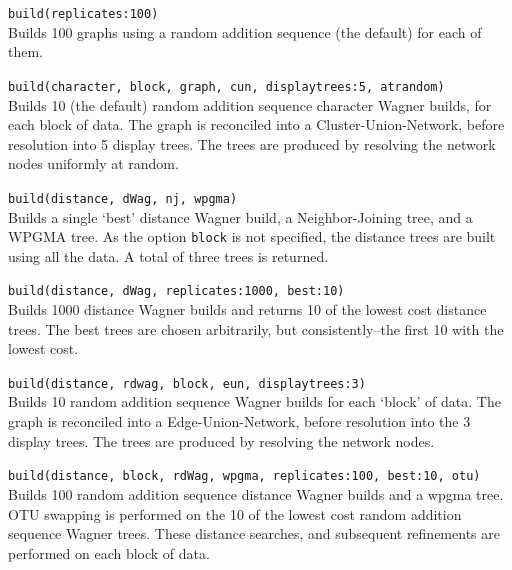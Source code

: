 	\begin{example}
		\item{\texttt{build(replicates:100)} \\
		Builds 100 graphs using a random addition sequence (the default) for each of them.}
		
		\item{\texttt{build(character, block, graph, cun, displaytrees:5, atrandom)}\\
		Builds 10 (the default) random addition sequence character Wagner builds, for each 
		block of data. The graph is reconciled into a Cluster-Union-Network, before resolution 
		into 5 display trees. The trees are produced by resolving the network nodes 
		uniformly at random.}
		
		\item{\texttt{build(distance, dWag, nj, wpgma)} \\ 
		Builds a single `best' distance Wagner build, a Neighbor-Joining tree, and a 
		WPGMA tree. As the option \texttt{block} is not specified, the distance trees 
		are built using all the data. A total of three trees is returned.}
		
		\item{\texttt{build(distance, dWag, replicates:1000, best:10)}\\
		Builds 1000 distance Wagner builds and returns 10 of the lowest cost distance trees.
		The best trees are chosen arbitrarily, but consistently--the first 10 with the lowest cost.}
	
		\item{\texttt{build(distance, rdwag, block, eun, displaytrees:3)}\\
		Builds 10 random addition sequence Wagner builds for each `block' of data. The graph 
		is reconciled into a Edge-Union-Network, before resolution into the 3 display trees. 
		The trees are produced by resolving the network nodes.}
		
		\item{\texttt{build(distance, block, rdWag, wpgma, replicates:100, best:10, otu)}\\
		Builds 100 random addition sequence distance Wagner builds and a wpgma tree. 
		OTU swapping is performed on the 10 of the lowest cost random addition 
		sequence Wagner trees. These distance searches, and subsequent refinements are 
		performed on each block of data.}
	\end{example}

